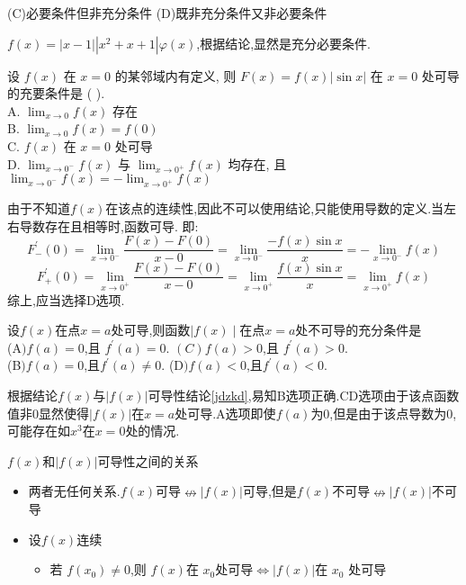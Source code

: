 \documentclass[8pt a4paper, oneside, UTF8]{ctexbook}  %
\begin{document}
\begin{sloppypar}
\begin{problem}
    (C)必要条件但非充分条件 \quad (D)既非充分条件又非必要条件
    \end{problem}
    \begin{solution}
        $f(x)=|x-1||x^2+x+1|\varphi(x)$,根据结论,显然是充分必要条件.
    \end{solution}
    \begin{problem}
    设 $f(x)$ 在 $x=0$ 的某邻域内有定义, 则 $F(x)=f(x)|\sin x|$ 在 $x=0$ 处可导的充要条件是 ( ).\\
    A. $\lim _{x \rightarrow 0} f(x)$ 存在\\
    B. $\lim _{x \rightarrow 0} f(x)=f(0)$\\
    C. $f(x)$ 在 $x=0$ 处可导\\
    D. $\lim _{x \rightarrow 0^{-}} f(x)$ 与 $\lim _{x \rightarrow 0^{+}} f(x)$ 均存在, 且 $\lim _{x \rightarrow 0^{-}} f(x)=-\lim _{x \rightarrow 0^{+}} f(x)$
    \end{problem}
    \begin{solution}
        由于不知道$f(x)$在该点的连续性,因此不可以使用结论,只能使用导数的定义.当左右导数存在且相等时,函数可导. 即:
        $$
            F_{-}^{\prime}(0)=\lim_{x\to0^{-}}\frac{F(x)-F(0)}{x-0}=\lim_{x\to0^{-}}\frac{-f(x)\sin x}{x}=-\lim_{x\to0^{-}}f(x)
        $$
        $$
            F_{+}^{\prime}(0)=\lim_{x\to0^{+}}\frac{F(x)-F(0)}{x-0}=\lim_{x\to0^{+}}\frac{f(x)\sin x}{x}=\lim_{x\to0^{+}}f(x)
        $$
        综上,应当选择D选项.
    \end{solution}
    \begin{problem}
    设$f(x)$在点$x=a$处可导,则函数$\mid f(x)\mid$在点$x=a$处不可导的充分条件是\\
    (A$)f(a)=0$,且 $f^\prime(a)=0.$ \quad $(C)f(a)>0$,且 $f^\prime(a)>0.$ \\
    (B$)f(a)=0$,且$f^\prime(a)\neq0.$ \quad   (D$)f(a)<0$,且$f^\prime(a)<0.$
    \end{problem}
    \begin{solution}
        根据结论$f(x)$与$|f(x)|$可导性结论\ref{jdzkd},易知B选项正确.CD选项由于该点函数值非0显然使得$|f(x)|$在$x=a$处可导.A选项即使$f(a)$为0,但是由于该点导数为0,可能存在如$x^3$在$x=0$处的情况.
    \end{solution}
    \begin{lemma}{$f(x)$和$|f(x)|$可导性之间的关系}{}\label{jdzkd}
        \begin{itemize}
            \item 两者无任何关系.$f(x)$可导$\nleftrightarrow |f(x)|$可导,但是$f(x)$不可导$\nleftrightarrow |f(x)|$不可导
            \item 设$f(x)$连续
                  \begin{itemize}
                      \item 若 $f\left(x_{0}\right)\neq$0,则 $f\left(x\right)$在 $x_{0}$处可导$\Leftrightarrow\left|f\left(x\right)\right|$在 $x_{0}$ 处可导


\end{itemize}
\end{itemize}
\end{lemma}
\end{sloppypar}
\end{document}
